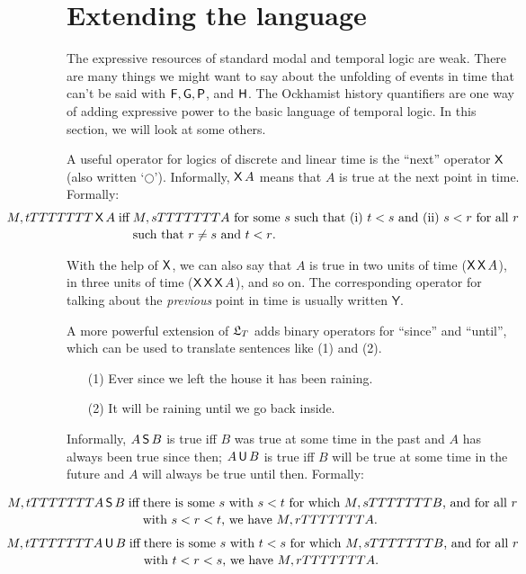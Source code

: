 \section{Extending the language}\label{sec:2d}

The expressive resources of standard modal and temporal logic are weak. There
are many things we might want to say about the unfolding of events in time that
can't be said with $\operatorname{\mathsf{F}}, \operatorname{\mathsf{G}}, \operatorname{\mathsf{P}}$, and $\operatorname{\mathsf{H}}$. The Ockhamist history quantifiers
are one way of adding expressive power to the basic language of temporal logic.
In this section, we will look at some others.

A useful operator for logics of discrete and linear time is the ``next''
operator $\operatorname{\mathsf{X}}$ (also written `$\bigcirc$'). Informally, $\operatorname{\mathsf{X}} A$ means that $A$
is true at the next point in time. Formally:
%
\begin{align*}
\hspace{-17mm}
  M,t \models \tX A \;\text{iff} & \;\text{$M,s \models A$ for some $s$ such that (i) $t<s$ and (ii) $s<r$ for all $r$}\\[-0.5mm]
  & \;\text{such that $r\not=s$ and $t<r$.}
\end{align*}

With the help of $\operatorname{\mathsf{X}}$, we can also say that $A$ is true in two units of time
($\operatorname{\mathsf{X}}\operatorname{\mathsf{X}} A$), in three units of time ($\operatorname{\mathsf{X}}\operatorname{\mathsf{X}}\operatorname{\mathsf{X}} A$), and so on. The
corresponding operator for talking about the \emph{previous} point in time is
usually written $\mathsf{Y}$.

A more powerful extension of $\mathfrak{L}_T$ adds binary operators for ``since'' and
``until'', which can be used to translate sentences like (1) and (2).
%
\begin{itemize}[leftmargin=10mm]
  \itemsep-1mm
\item[(1)] Ever since we left the house it has been raining.
\item[(2)] It will be raining until we go back inside.
\end{itemize}
%
Informally, $A\operatorname{\mathsf{S}} B$ is true iff $B$ was true at some time in the past and $A$
has always been true since then; $A \operatorname{\mathsf{U}} B$ is true iff $B$ will be true at some
time in the future and $A$ will always be true until then. Formally:

\vspace{-5mm}
\begin{align*}
  \hspace{-17mm}
  M,t \models A \tS B \;\text{iff} &\; \text{there is some $s$ with $s < t$ for which $M,s \models B$, and for all $r$}\\[-0.5mm]
                                    &\;\text{with $s < r < t$, we have $M, r \models A$.}
\end{align*}
\vspace{-12mm}
\begin{align*}
  \hspace{-17mm}
M,t \models A \tU B \;\text{iff} &\; \text{there is some $s$ with $t < s$ for which $M,s \models B$, and for all $r$}\\[-0.5mm]
  &\;\text{with $t < r < s$, we have $M, r \models A$.}
\end{align*}

